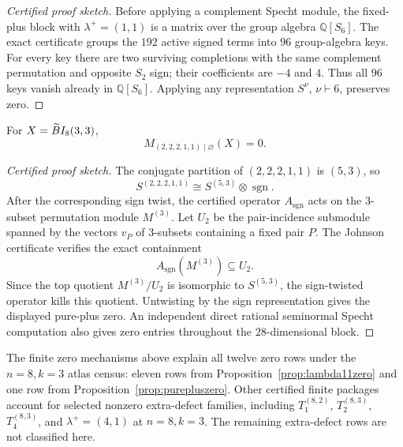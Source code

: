 \begin{proof}[Certified proof sketch]
Before applying a complement Specht module, the fixed-plus block with $\lambda^+=(1,1)$ is a matrix over the group
algebra $\mathbb Q[S_6]$.  The exact certificate groups the $192$ active signed terms into $96$ group-algebra keys.
For every key there are two surviving completions with the same complement permutation and opposite $S_2$ sign; their
coefficients are $-4$ and $4$.  Thus all $96$ keys vanish already in $\mathbb Q[S_6]$.  Applying any representation
$S^\nu$, $\nu\vdash6$, preserves zero.
\end{proof}

\begin{proposition}\label{prop:purepluszero}
For $X=\widetilde{B}I_8(3,3)$,
\[
  M_{(2,2,2,1,1)\mid\varnothing}(X)=0.
\]
\end{proposition}

\begin{proof}[Certified proof sketch]
The conjugate partition of $(2,2,2,1,1)$ is $(5,3)$, so
\[
  S^{(2,2,2,1,1)} \cong S^{(5,3)}\otimes\operatorname{sgn}.
\]
After the corresponding sign twist, the certified operator $A_{\operatorname{sgn}}$ acts on the $3$-subset permutation
module $M^{(3)}$.  Let $U_2$ be the pair-incidence submodule spanned by the vectors $v_P$ of $3$-subsets containing a
fixed pair $P$.  The Johnson certificate verifies the exact containment
\[
  A_{\operatorname{sgn}}(M^{(3)})\subseteq U_2.
\]
Since the top quotient $M^{(3)}/U_2$ is isomorphic to $S^{(5,3)}$, the sign-twisted operator kills this quotient.
Untwisting by the sign representation gives the displayed pure-plus zero.  An independent direct rational seminormal
Specht computation also gives zero entries throughout the $28$-dimensional block.
\end{proof}

\begin{remark}
The finite zero mechanisms above explain all twelve zero rows under the $n=8,k=3$ atlas census: eleven rows from
Proposition~\ref{prop:lambda11zero} and one row from Proposition~\ref{prop:purepluszero}.  Other certified finite
packages account for selected nonzero extra-defect families, including $T_1^{(8,2)}$, $T_2^{(8,3)}$, $T_4^{(8,3)}$, and
$\lambda^+=(4,1)$ at $n=8,k=3$.  The remaining extra-defect rows are not classified here.
\end{remark}
